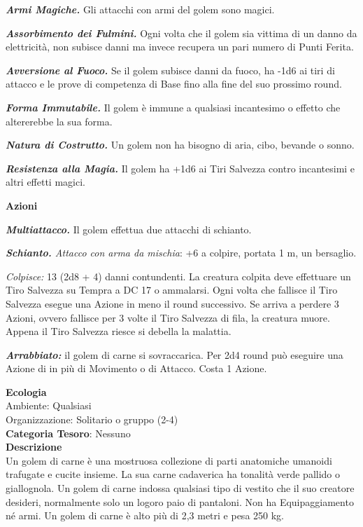 \begin{multicols}{2}
{\emph{\textbf{Armi Magiche.}} Gli attacchi con armi del golem sono magici.

\emph{\textbf{Assorbimento dei Fulmini.}} Ogni volta che il golem sia vittima di un danno da elettricità, non subisce danni ma invece recupera un pari numero di Punti Ferita.

\emph{\textbf{Avversione al Fuoco.}} Se il golem subisce danni da fuoco, ha -1d6 ai tiri di attacco e le prove di competenza di Base fino alla fine del suo prossimo round.

\emph{\textbf{Forma Immutabile.}} Il golem è immune a qualsiasi incantesimo o effetto che altererebbe la sua forma.

\emph{\textbf{Natura di Costrutto.}} Un golem non ha bisogno di aria, cibo, bevande o sonno.

\emph{\textbf{Resistenza alla Magia.}} Il golem ha +1d6 ai Tiri Salvezza contro incantesimi e altri effetti magici.

\textbf{Azioni}

\emph{\textbf{Multiattacco.}} Il golem effettua due attacchi di schianto.

\emph{\textbf{Schianto.} Attacco con arma da mischia}: +6 a colpire, portata 1 m, un bersaglio.

\emph{Colpisce:} 13 (2d8 + 4) danni contundenti. La creatura colpita deve effettuare un Tiro Salvezza su Tempra a DC 17 o ammalarsi. Ogni volta che fallisce il Tiro Salvezza esegue una Azione in meno il round successivo. Se arriva a perdere 3 Azioni, ovvero fallisce per 3 volte il Tiro Salvezza di fila, la creatura muore. Appena il Tiro Salvezza riesce si debella la malattia.

\emph{\textbf{Arrabbiato:}} il golem di carne si sovraccarica. Per 2d4 round può eseguire una Azione di in più di Movimento o di Attacco. Costa 1 Azione.

\textbf{Ecologia}\\
Ambiente: Qualsiasi\\
Organizzazione: Solitario o gruppo (2-4)\\
\textbf{Categoria Tesoro}: Nessuno\\
\textbf{Descrizione}\\
Un golem di carne è una mostruosa collezione di parti anatomiche umanoidi trafugate e cucite insieme. La sua carne cadaverica ha tonalità verde pallido o giallognola. Un golem di carne indossa qualsiasi tipo di vestito che il suo creatore desideri, normalmente solo un logoro paio di pantaloni. Non ha Equipaggiamento né armi. Un golem di carne è alto più di 2,3 metri e pesa 250 kg.

}
\end{multicols}
